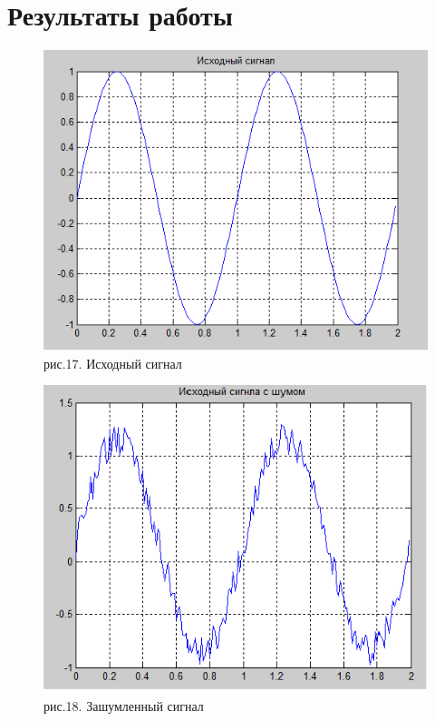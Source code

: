 \documentclass[10pt,a4paper]{report}
\begin{document}
\section{Результаты работы}
\begin{figure}
\begin{center}
\includegraphics[angle=0, scale = 0.9]{6_1.png}\newline
рис.17. Исходный сигнал\newline
\end{center}
\end{figure}
\begin{figure}
\begin{center}
\includegraphics[angle=0, scale = 0.9]{6_2.png}\newline
рис.18. Зашумленный сигнал\newline
\end{center}
\end{figure}
\end{document}
